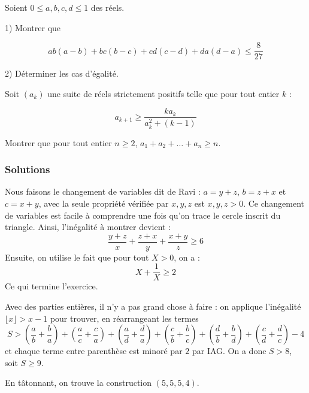\begin{exo}[BXMO 2019]
Soient $0\le a,b,c,d\le 1$ des réels.

1) Montrer que

$$ab(a-b)+bc(b-c)+cd(c-d)+da(d-a) \le \frac{8}{27}$$

2) Déterminer les cas d'égalité.
\end{exo}


\begin{exo}[IMO SL 2015 A1]
Soit $(a_k)$ une suite de réels strictement positifs telle que pour tout entier $k$ :

$$a_{k+1} \ge \frac{ka_k}{a_k^2 +(k-1)}$$

Montrer que pour tout entier $n\ge 2$, $a_1+a_2+\ldots +a_n \ge n$.
\end{exo}


\subsubsection{Solutions}


\begin{sol}
Nous faisons le changement de variables dit de Ravi : $a=y+z$, $b=z+x$ et $c=x+y$, avec la seule propriété vérifiée par $x,y,z$ est $x,y,z>0$. Ce changement de variables est facile à comprendre une fois qu'on trace le cercle inscrit du triangle. Ainsi, l'inégalité à montrer devient :
$$\frac{y+z}{x}+\frac{z+x}{y}+\frac{x+y}{z} \ge 6$$
Ensuite, on utilise le fait que pour tout $X>0$, on a :
$$X+\frac1{X}\ge 2$$
Ce qui termine l'exercice.
\end{sol}


\begin{sol}
Avec des parties entières, il n'y a pas grand chose à faire : on applique l'inégalité $\lfloor x \rfloor >x-1$ pour trouver, en réarrangeant les termes
$$S > \left(\frac{a}{b}+ \frac{b}{a}\right) + \left(\frac{a}{c}+ \frac{c}{a}\right)+\left(\frac{a}{d}+ \frac{d}{a}\right) +\left(\frac{c}{b}+ \frac{b}{c}\right) +\left(\frac{d}{b}+ \frac{b}{d}\right) + \left(\frac{c}{d}+ \frac{d}{c}\right)-4$$
et chaque terme entre parenthèse est minoré par $2$ par IAG. On a donc $S>8$, soit $S\ge 9$.

En tâtonnant, on trouve la construction $(5,5,5,4)$.
\end{sol}


